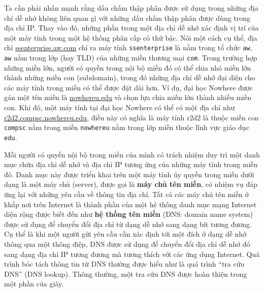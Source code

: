 Ta cần phải nhấn mạnh rằng dấu chấm thập phân được sử dụng trong những địa chỉ dễ
nhớ không liên quan gì với những dấu chấm thập phân được dùng trong địa chỉ IP. Thay vào
đó, những phần trong một địa chỉ dễ nhớ xác định vị trí của một máy tính trong một hệ
thống phân cấp có thứ bậc. Nói một cách cụ thể, địa chỉ \url{ssenterprise.aw.com} chỉ ra
máy tính \texttt{ssenterprise} là nằm trong tổ chức \texttt{aw}, \texttt{aw} nằm trong lớp
(hay TLD) của những miền thương mại \texttt{com}. Trong trường hợp những miền lớn, người
có quyền trong nội bộ miền đó có thể chia nhỏ miền lớn thành những miền con (subdomain),
trong đó những địa chỉ dễ nhớ đại diện cho các máy tính trong miền có thể được đặt dài
hơn. Ví dụ, đại học Nowhere được gán một tên miền là \url{nowhereu.edu} và chọn lựa chia
miền lớn thành nhiều miền con. Khi đó, một máy tính tại đại học Nowhere có thể có một địa
chỉ như \url{r2d2.compsc.nowhereu.edu}, điều này có nghĩa là máy tính r2d2 là thuộc miền
con \texttt{compsc} nằm trong miền \texttt{nowhereu} nằm trong lớp miền thuộc lĩnh vực
giáo dục \texttt{edu}.

Mỗi người có quyền nội bộ trong miền của mình có trách nhiệm duy trì một danh mục chứa địa
chỉ dễ nhớ và địa chỉ IP tương ứng của những máy tính trong miền đó. Danh mục này được
triển khai trên một máy tính ủy quyền trong miền dưới dạng là một máy chủ (server), được
gọi là \textbf{máy chủ tên miền}, có nhiệm vụ đáp ứng lại với những yêu cầu về thông tin
địa chỉ. Tất cả các máy chủ tên miền ở khắp nơi trên Internet là thành phần của một hệ
thống danh mục mạng Internet diện rộng được biết đến như \textbf{hệ thống tên miền} (DNS:
domain name system) được sử dụng để chuyển đổi địa chỉ từ dạng dễ nhớ sang dạng bít tương
đương. Cụ thể là khi một người gửi yêu cầu cần xác định tới một đích ở dạng dễ nhớ thông
qua một thông điệp, DNS được sử dụng để chuyển đổi địa chỉ dễ nhớ đó sang dạng địa chỉ IP
tương đương mà tương thích với các ứng dụng Internet. Quá trình bóc tách thông tin từ DNS
thường được hiểu như là quá trình ``tra cứu DNS'' (DNS lookup). Thông thường, một tra cứu
DNS được hoàn thiện trong một phần của giây.


